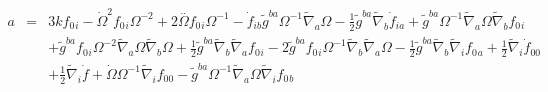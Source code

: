 \documentclass[10pt,letterpaper]{article}
\numberwithin{equation}{section}
\begin{document}
\begin{eqnarray}
a&=& 3 k f_{0}{}_{i} -  \dot{\Omega}^2 f_{0}{}_{i} \Omega^{-2} + 2 \overset{..}{\Omega} f_{0}{}_{i} \Omega^{-1} -  \dot{f}_{ib} \tilde{g}^{ba} \Omega^{-1} \tilde{\nabla}_{a}\Omega -  \tfrac{1}{2} \tilde{g}^{ba} \tilde{\nabla}_{b}\dot{f}_{ia} + \tilde{g}^{ba} \Omega^{-1} \tilde{\nabla}_{a}\Omega \tilde{\nabla}_{b}f_{0}{}_{i} \nonumber \\ 
&& + \tilde{g}^{ba} f_{0}{}_{i} \Omega^{-2} \tilde{\nabla}_{a}\Omega \tilde{\nabla}_{b}\Omega + \tfrac{1}{2} \tilde{g}^{ba} \tilde{\nabla}_{b}\tilde{\nabla}_{a}f_{0}{}_{i} - 2 \tilde{g}^{ba} f_{0}{}_{i} \Omega^{-1} \tilde{\nabla}_{b}\tilde{\nabla}_{a}\Omega -  \tfrac{1}{2} \tilde{g}^{ba} \tilde{\nabla}_{b}\tilde{\nabla}_{i}f_{0}{}_{a} + \tfrac{1}{2} \tilde{\nabla}_{i}\dot{f}_{00}{} \nonumber \\ 
&& + \tfrac{1}{2} \tilde{\nabla}_{i}\dot{f} + \dot{\Omega} \Omega^{-1} \tilde{\nabla}_{i}f_{00}{} -  \tilde{g}^{ba} \Omega^{-1} \tilde{\nabla}_{a}\Omega \tilde{\nabla}_{i}f_{0}{}_{b}
\end{eqnarray}
\end{document}
